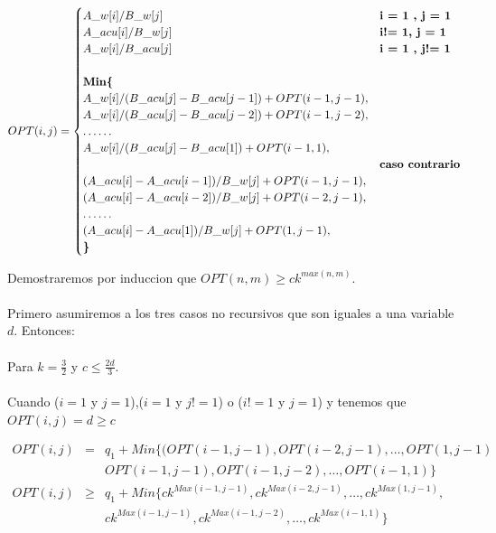\documentclass[12pt]{article}
\begin{document}
\begin{equation*}
OPT(i,j) =
\begin{cases}
		A\_w[i]/B\_w[j] & \textbf{\text{i = 1 , j = 1}}\\
		A\_acu[i]/B\_w[j] & \textbf{\text{i!= 1, j = 1}}\\
		A\_w[i]/B\_acu[j] & \textbf{\text{i = 1 , j!= 1}}\\
\\
\textbf{Min\{ } &\\
		A\_w[i]/(B\_acu[j] - B\_acu[j-1]) + OPT(i-1,j-1), &\\
		A\_w[i]/(B\_acu[j] - B\_acu[j-2]) + OPT(i-1,j-2),  &\\
		\dots  \dots  &\\
		A\_w[i]/(B\_acu[j] - B\_acu[1]) + OPT(i-1,1), &\\
		& \textbf{\text{caso contrario}}\\
		(A\_acu[i] - A\_acu[i-1])/B\_w[j] + OPT(i-1,j-1), &\\
		(A\_acu[i] - A\_acu[i-2])/B\_w[j] + OPT(i-2,j-1), &\\
		\dots \dots &\\
		(A\_acu[i] - A\_acu[1])/B\_w[j] + OPT(1,j-1), &\\
\textbf{\}} \\
\end{cases}
\end{equation*}

Demostraremos por induccion que $OPT(n,m)\geq ck^{max(n,m)}$.\\ \\
Primero asumiremos a los tres casos no recursivos que son iguales a una variable $d$. Entonces: \\ \\
Para $k=\frac{3}{2}$ y $c\leq \frac{2d}{3}$.  \\ \\
Cuando ($i=1$ y $j=1$),($i=1$ y $j!=1$) o ($i!=1$ y $j=1$) y  tenemos que $OPT(i,j) = d \geq c$ 


\begin{eqnarray*}
		OPT(i,j)&=&q_1 + Min\{(OPT(i-1,j-1),OPT(i-2,j-1), \dots , OPT(1,j-1) \\
				&&OPT(i-1,j-1),OPT(i-1,j-2), \dots , OPT(i-1,1)\} \\
				OPT(i,j)&\geq&q_1 + Min\{ck^{Max(i-1,j-1)}, ck^{Max(i-2,j-1)}, \dots ,ck^{Max(1,j-1)},\\ 
				&&ck^{Max(i-1,j-1)}, ck^{Max(i-1,j-2)}, \dots , ck^{Max(i-1,1)}\}

\end{eqnarray*}
\end{document}
